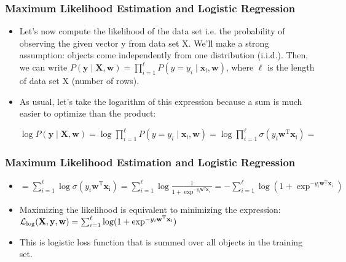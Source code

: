 \begin{frame}[fragile]\frametitle{Maximum Likelihood Estimation and Logistic Regression}
 \begin{itemize}

 \item Let's now compute the likelihood of the data set i.e. the probability of observing the given vector y from data set X. We'll make a strong assumption: objects come independently from one distribution (i.i.d.). Then, we can write $P\left(\textbf{y} \mid \textbf{X}, \textbf{w}\right) = \prod_{i=1}^{\ell} P\left(y = y_i \mid \textbf{x}_\text{i}, \textbf{w}\right)$, where $\ell$ is the length of data set X (number of rows).
 
 \item As usual, let's take the logarithm of this expression because a sum is much easier to optimize than the product:
 
 $\log P\left(\textbf{y} \mid \textbf{X}, \textbf{w}\right) = \log \prod_{i=1}^{\ell} P\left(y = y_i \mid \textbf{x}_\text{i}, \textbf{w}\right) = \log \prod_{i=1}^{\ell} \sigma(y_i\textbf{w}^\text{T}\textbf{x}_\text{i})   =$
\end{itemize}

\end{frame}

\begin{frame}[fragile]\frametitle{Maximum Likelihood Estimation and Logistic Regression}
 \begin{itemize}

 \item $  = \sum_{i=1}^{\ell} \log \sigma(y_i\textbf{w}^\text{T}\textbf{x}_\text{i}) = \sum_{i=1}^{\ell} \log \frac{1}{1 + \exp^{-y_i\textbf{w}^\text{T}\textbf{x}_\text{i}}} = - \sum_{i=1}^{\ell} \log (1 + \exp^{-y_i\textbf{w}^\text{T}\textbf{x}_\text{i}})$
 
 \item Maximizing the likelihood is equivalent to minimizing the expression: $\mathcal{L_{\log}} (\textbf X, \textbf{y}, \textbf{w}) = \sum_{i=1}^{\ell} \log (1 + \exp^{-y_i\textbf{w}^\text{T}\textbf{x}_\text{i}})$
 
 \item This is logistic loss function that is summed over all objects in the training set.
\end{itemize}

\end{frame}



